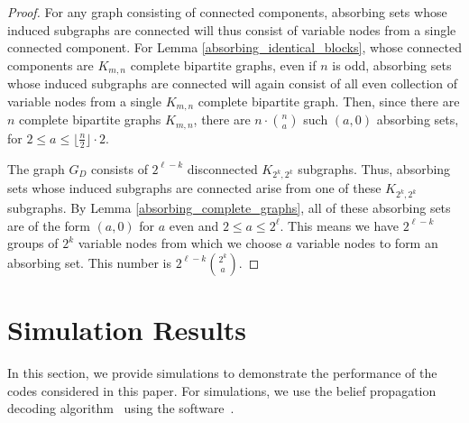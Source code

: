 \documentclass[11pt]{article}
\theoremstyle{plain}
\theoremstyle{plain}
\theoremstyle{definition}
\numberwithin{theo}{section}
\newcounter{rom}
\begin{document}
\begin{proof}
For any graph consisting of connected components, absorbing sets whose induced subgraphs are connected will thus consist of variable nodes from a single connected component. For Lemma \ref{absorbing_identical_blocks}, whose connected components are $K_{m,n}$ complete bipartite graphs, even if $n$ is odd, absorbing sets whose induced subgraphs are connected will again consist of all even collection of variable nodes from a single $K_{m,n}$ complete bipartite graph. 
Then, since there are $n$ complete bipartite graphs $K_{m,n}$, there are $n \cdot \binom{n}{a}$ such $(a,0)$ absorbing sets, for $2 \leq a \leq \lfloor \frac{n}{2} \rfloor \cdot 2$.

The graph $G_D$ consists of $2^{\ell - k}$ disconnected $K_{2^k,2^k}$ subgraphs. Thus, absorbing sets whose induced subgraphs are connected arise from one of these $K_{2^k, 2^k}$ subgraphs. By Lemma \ref{absorbing_complete_graphs}, all of these absorbing sets are of the form $(a,0)$ for $a$ even and $2 \leq a \leq 2^{\ell}$. This means we have $2^{\ell-k}$ groups of $2^k$ variable nodes from which we choose $a$ variable nodes to form an absorbing set. This number is $2^{\ell-k}\binom{2^k}{a}.$
\end{proof}


\section{Simulation Results}
\label{sec:simulation_results}

In this section, we provide simulations to demonstrate the performance of the codes considered in this paper. For simulations, we use the belief propagation decoding algorithm~\cite{BP} using the software~\cite{Roffe_LDPC_Python_tools_2022}. 
\end{document}

